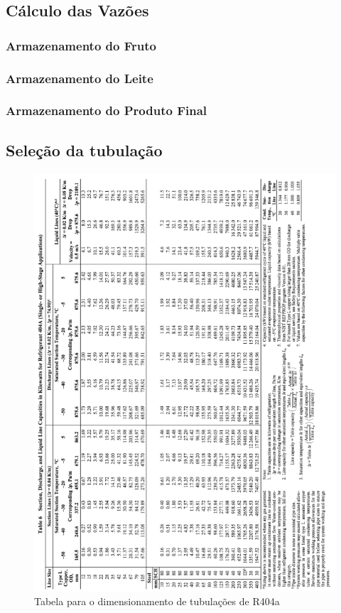 \documentclass[10pt,a4paper]{article}
\begin{document}
\subsection{Cálculo das Vazões}
\subsubsection{Armazenamento do Fruto}


\subsubsection{Armazenamento do Leite}


\subsubsection{Armazenamento do Produto Final}


\newpage

\subsection{Seleção da tubulação}

\begin{figure}[H]
    \centering
    \includegraphics{Figuras/tub404a.PNG}
    \caption{Tabela para o  dimensionamento de tubulações de R404a}
    \label{fig:dimtub}
\end{figure}
\end{document}
